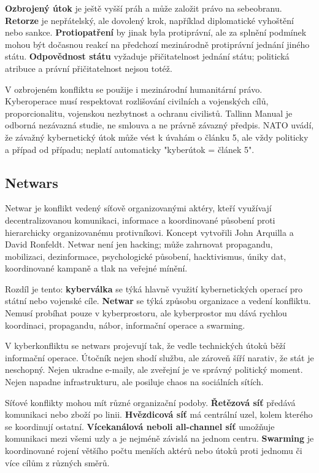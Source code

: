 \textbf{Ozbrojený útok} je ještě vyšší práh a může založit právo na sebeobranu. \textbf{Retorze} je nepřátelský, ale dovolený krok, například diplomatické vyhoštění nebo sankce. \textbf{Protiopatření} by jinak byla protiprávní, ale za splnění podmínek mohou být dočasnou reakcí na předchozí mezinárodně protiprávní jednání jiného státu. \textbf{Odpovědnost státu} vyžaduje přičitatelnost jednání státu; politická atribuce a právní přičitatelnost nejsou totéž.

V ozbrojeném konfliktu se použije i mezinárodní humanitární právo. Kyberoperace musí respektovat rozlišování civilních a vojenských cílů, proporcionalitu, vojenskou nezbytnost a ochranu civilistů. Tallinn Manual je odborná nezávazná studie, ne smlouva a ne právně závazný předpis. NATO uvádí, že závažný kybernetický útok může vést k úvahám o článku 5, ale vždy politicky a případ od případu; neplatí automaticky "kyberútok = článek 5".

\subsection*{Netwars}
Netwar je konflikt vedený síťově organizovanými aktéry, kteří využívají decentralizovanou komunikaci, informace a koordinované působení proti hierarchicky organizovanému protivníkovi. Koncept vytvořili John Arquilla a David Ronfeldt. Netwar není jen hacking; může zahrnovat propagandu, mobilizaci, dezinformace, psychologické působení, hacktivismus, úniky dat, koordinované kampaně a tlak na veřejné mínění.

Rozdíl je tento: \textbf{kyberválka} se týká hlavně využití kybernetických operací pro státní nebo vojenské cíle. \textbf{Netwar} se týká způsobu organizace a vedení konfliktu. Nemusí probíhat pouze v kyberprostoru, ale kyberprostor mu dává rychlou koordinaci, propagandu, nábor, informační operace a swarming.

V kyberkonfliktu se netwars projevují tak, že vedle technických útoků běží informační operace. Útočník nejen shodí službu, ale zároveň šíří narativ, že stát je neschopný. Nejen ukradne e-maily, ale zveřejní je ve správný politický moment. Nejen napadne infrastrukturu, ale posiluje chaos na sociálních sítích.

Síťové konflikty mohou mít různé organizační podoby. \textbf{Řetězová síť} předává komunikaci nebo zboží po linii. \textbf{Hvězdicová síť} má centrální uzel, kolem kterého se koordinují ostatní. \textbf{Vícekanálová neboli all-channel síť} umožňuje komunikaci mezi všemi uzly a je nejméně závislá na jednom centru. \textbf{Swarming} je koordinované rojení většího počtu menších aktérů nebo útoků proti jednomu či více cílům z různých směrů.

